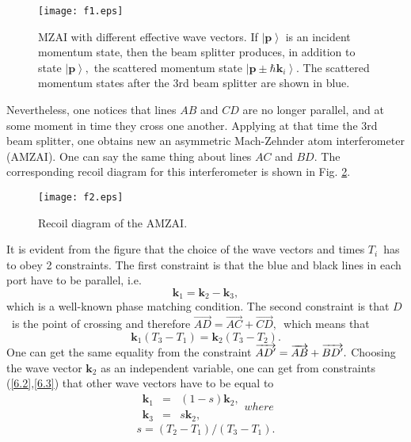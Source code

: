 \documentclass[twocolumn,showpacs,preprintnumbers]{revtex4}
\begin{document}
\begin{figure}[!t]
\texttt{[image: f1.eps]}
\caption{MZAI with different effective wave vectors. If $\left\vert \mathbf{p%
}\right\rangle $ is an incident momentum state, then the beam splitter
produces, in addition to state $\left\vert \mathbf{p}\right\rangle ,$ the
scattered momentum state $\left\vert \mathbf{p}\pm \hbar \mathbf{k}%
_{i}\right\rangle $. The scattered momentum states after the 3rd beam
splitter are shown in blue.}
\label{f1}
\end{figure}

Nevertheless, one notices that lines $AB$ and $CD$ are no longer parallel,
and at some moment in time they cross one another. Applying at that time the
3rd beam splitter, one obtains new an asymmetric Mach-Zehnder atom
interferometer (AMZAI). One can say the same thing about lines $AC$ and $BD.$
The corresponding recoil diagram for this interferometer is shown in Fig. %
\ref{f2}.

\begin{figure}[!t]
\texttt{[image: f2.eps]}
\caption{Recoil diagram of the AMZAI.}
\label{f2}
\end{figure}

It is evident from the figure that the choice of the wave vectors and times $%
T_{i}$\ has to obey 2 constraints. The first constraint is that the blue and
black lines in each port have to be parallel, i.e.%
\begin{equation}
\mathbf{k}_{1}=\mathbf{k}_{2}-\mathbf{k}_{3},  \label{6.2}
\end{equation}%
which is a well-known phase matching condition. The second constraint is
that $D$\ is the point of crossing and therefore $\overrightarrow{AD}=%
\overrightarrow{AC}+\overrightarrow{CD},$\ which means that%
\begin{equation}
\mathbf{k}_{1}\left( T_{3}-T_{1}\right) =\mathbf{k}_{2}\left(
T_{3}-T_{2}\right) .  \label{6.3}
\end{equation}%
One can get the same equality from the constraint $\overrightarrow{%
AD^{\prime }}=\overrightarrow{AB}+\overrightarrow{BD^{\prime }}.$ Choosing
the wave vector $\mathbf{k}_{2}$ as an independent variable, one can get
from constraints (\ref{6.2},\ref{6.3}) that other wave vectors have to be
equal to\ 
\begin{subequations}
\label{13}
\begin{eqnarray}
\mathbf{k}_{1} &=&\left( 1-s\right) \mathbf{k}_{2},  \label{13a} \\
\mathbf{k}_{3} &=&s\mathbf{k}_{2},  \label{13b}
\end{eqnarray}%
where 
\end{subequations}
\begin{equation}
s=\left( T_{2}-T_{1}\right) /\left( T_{3}-T_{1}\right) .  \label{13.1}
\end{equation}
\end{document}
